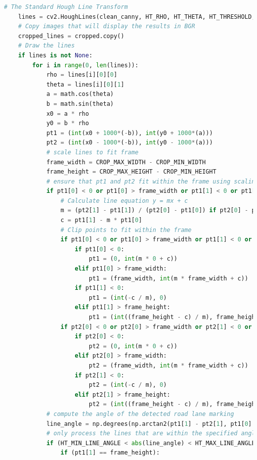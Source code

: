 \documentclass[10pt,conference]{IEEEtran}
\begin{document}
\begin{lstlisting}[language=Python,basicstyle=\tiny, showspaces=false, showstringspaces=false tabsize=1, breaklines=true]
    # The Standard Hough Line Transform
    lines = cv2.HoughLines(clean_canny, HT_RHO, HT_THETA, HT_THRESHOLD, None, 0, 0)
    # Copy images that will display the results in BGR
    cropped_lines = cropped.copy()
    # Draw the lines
    if lines is not None:
        for i in range(0, len(lines)):
            rho = lines[i][0][0]
            theta = lines[i][0][1]
            a = math.cos(theta)
            b = math.sin(theta)
            x0 = a * rho
            y0 = b * rho
            pt1 = (int(x0 + 1000*(-b)), int(y0 + 1000*(a)))
            pt2 = (int(x0 - 1000*(-b)), int(y0 - 1000*(a)))
            # scale lines to fit frame
            frame_width = CROP_MAX_WIDTH - CROP_MIN_WIDTH
            frame_height = CROP_MAX_HEIGHT - CROP_MIN_HEIGHT
            # ensure that pt1 and pt2 fit within the frame using scaling and tranforming
            if pt1[0] < 0 or pt1[0] > frame_width or pt1[1] < 0 or pt1[1] > frame_height or pt2[0] < 0 or pt2[0] > frame_width or pt2[1] < 0 or pt2[1] > frame_height:
                # Calculate line equation y = mx + c
                m = (pt2[1] - pt1[1]) / (pt2[0] - pt1[0]) if pt2[0] - pt1[0] != 0 else 1
                c = pt1[1] - m * pt1[0]
                # Clip points to fit within the frame
                if pt1[0] < 0 or pt1[0] > frame_width or pt1[1] < 0 or pt1[1] > frame_height:
                    if pt1[0] < 0:
                        pt1 = (0, int(m * 0 + c))
                    elif pt1[0] > frame_width:
                        pt1 = (frame_width, int(m * frame_width + c))
                    if pt1[1] < 0:
                        pt1 = (int(-c / m), 0)
                    elif pt1[1] > frame_height:
                        pt1 = (int((frame_height - c) / m), frame_height)
                if pt2[0] < 0 or pt2[0] > frame_width or pt2[1] < 0 or pt2[1] > frame_height:
                    if pt2[0] < 0:
                        pt2 = (0, int(m * 0 + c))
                    elif pt2[0] > frame_width:
                        pt2 = (frame_width, int(m * frame_width + c))
                    if pt2[1] < 0:
                        pt2 = (int(-c / m), 0)
                    elif pt2[1] > frame_height:
                        pt2 = (int((frame_height - c) / m), frame_height)
            # compute the angle of the detected road lane marking
            line_angle = np.degrees(np.arctan2(pt1[1] - pt2[1], pt1[0] - pt2[0]))
            # only process the lines that are within the specified angle range to filter false detections
            if (HT_MIN_LINE_ANGLE < abs(line_angle) < HT_MAX_LINE_ANGLE):
                if (pt1[1] == frame_height):

\end{lstlisting}
\end{document}
